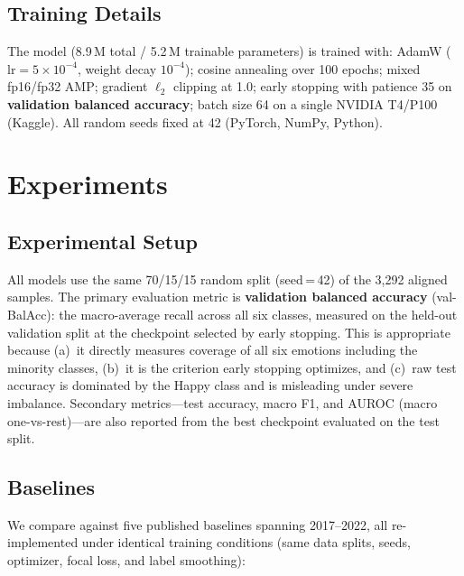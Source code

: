 \documentclass[conference]{IEEEtran}
\begin{document}
\subsection{Training Details}
\label{sec:training_details}

The model (8.9\,M total / 5.2\,M trainable parameters) is trained with:
AdamW ($\mathrm{lr}=5\times10^{-4}$, weight decay $10^{-4}$); cosine annealing
over 100 epochs; mixed fp16/fp32 AMP; gradient $\ell_2$ clipping at 1.0;
early stopping with patience 35 on \textbf{validation balanced accuracy};
batch size 64 on a single NVIDIA T4/P100 (Kaggle).  All random seeds fixed at
42 (PyTorch, NumPy, Python).

\section{Experiments}
\label{sec:experiments}

\subsection{Experimental Setup}

All models use the same 70/15/15 random split (seed\,=\,42) of the 3{,}292
aligned samples.  The primary evaluation metric is \textbf{validation balanced
accuracy} (val-BalAcc): the macro-average recall across all six classes,
measured on the held-out validation split at the checkpoint selected by early
stopping.  This is appropriate because (a)~it directly measures coverage of all
six emotions including the minority classes, (b)~it is the criterion early
stopping optimizes, and (c)~raw test accuracy is dominated by the Happy class
and is misleading under severe imbalance.  Secondary metrics---test accuracy,
macro F1, and AUROC (macro one-vs-rest)---are also reported from the best
checkpoint evaluated on the test split.

\subsection{Baselines}

We compare against five published baselines spanning 2017--2022, all
re-implemented under identical training conditions (same data splits, seeds,
optimizer, focal loss, and label smoothing):
\end{document}
